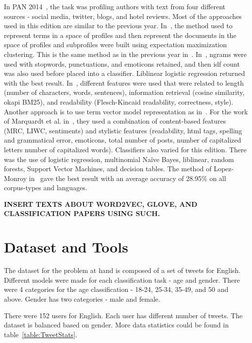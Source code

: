 \documentclass[a4paper]{llncs}
\begin{document}
In PAN 2014~\cite{rangel2014overview}, the task was profiling authors with text from four different sources - social media, twitter, blogs, and hotel reviews. Most of the approaches used in this edition are similar to the previous year. In~\cite{lopezusing}, the method used to represent terms in a space of profiles and then represent the documents in the space of profiles and subprofiles were built using expectation maximization clustering. This is the same method as in the previous year in~\cite{lopez2013inaoe}. In~\cite{maharjansimple}, ngrams were used with stopwords, punctuations, and emoticons retained, and then idf count was also used before placed into a classifier. Liblinear logistic regression returned with the best result. In~\cite{weren6exploring}, different features were used that were related to length (number of characters, words, sentences), information retrieval (cosine similarity, okapi BM25), and readability (Flesch-Kincaid readability, correctness, style). Another approach is to use term vector model representation as in~\cite{villenadaedalus}. For the work of Marquardt et al. in~\cite{marquardt2014age}, they used a combination of content-based features (MRC, LIWC, sentiments) and stylistic features (readability, html tags, spelling and grammatical error, emoticons, total number of posts, number of capitalized letters number of capitalized words). Classifiers also varied for this edition. There was the use of logistic regression, multinomial Naïve Bayes, liblinear, random forests, Support Vector Machines, and decision tables. The method of Lopez-Monroy in~\cite{lopezusing} gave the best result with an average accuracy of 28.95\% on all corpus-types and languages. 

\textbf{INSERT TEXTS ABOUT WORD2VEC, GLOVE, AND CLASSIFICATION PAPERS USING SUCH.}

\section{Dataset and Tools}
The dataset for the problem at hand is composed of a set of tweets for English. Different models were made for each classification task - age and gender. There were 4 categories for the age classification - 18-24, 25-34, 35-49, and 50 and above. Gender has two categories - male and female. 

There were 152 users for English. Each user has different number of tweets. The dataset is balanced based on gender. More data statistics could be found in table~\ref{table:TweetStats}.
\end{document}
